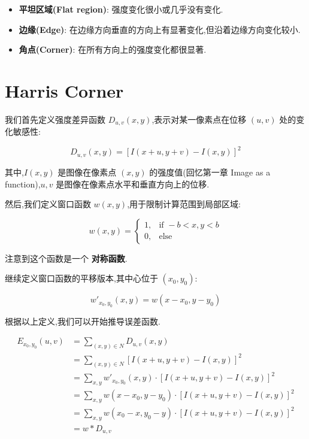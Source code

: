 \begin{itemize}
    \item \textbf{平坦区域(Flat region)}: 强度变化很小或几乎没有变化.
    \item \textbf{边缘(Edge)}: 在边缘方向垂直的方向上有显著变化,但沿着边缘方向变化较小.
    \item \textbf{角点(Corner)}: 在所有方向上的强度变化都很显著.
\end{itemize}

\section{Harris Corner}

我们首先定义强度差异函数 $D_{u,v}(x, y)$,表示对某一像素点在位移 $(u, v)$ 处的变化敏感性:

$$
D_{u,v}(x, y) = \left[I(x + u, y + v) - I(x, y)\right]^2
$$

其中,$I(x, y)$ 是图像在像素点 $(x, y)$ 的强度值(回忆第一章 Image as a function),$u, v$ 是图像在像素点水平和垂直方向上的位移.

然后,我们定义窗口函数 $w(x, y)$,用于限制计算范围到局部区域:

\begin{equation}
    w(x, y) =
    \begin{cases}
        1, & \text{if } -b < x, y < b \\
        0, & \text{else}
    \end{cases}
\end{equation}

注意到这个函数是一个 \textbf{对称函数}.

继续定义窗口函数的平移版本,其中心位于 $(x_0, y_0)$:

\begin{equation}
    w'_{x_0, y_0}(x, y) = w(x - x_0, y - y_0)
\end{equation}

根据以上定义,我们可以开始推导误差函数.

\begin{equation}
\begin{aligned}
E_{x_0, y_0}(u, v) &= \sum_{(x, y) \in N} D_{u,v}(x, y) \\
&= \sum_{(x, y) \in N} \left[I(x + u, y + v) - I(x, y)\right]^2 \\
&= \sum_{x, y} w'_{x_0, y_0}(x, y) \cdot \left[I(x + u, y + v) - I(x, y)\right]^2 \\
&= \sum_{x, y} w(x - x_0, y - y_0) \cdot \left[I(x + u, y + v) - I(x, y)\right]^2 \\
&= \sum_{x, y} w(x_0 - x, y_0 - y) \cdot \left[I(x + u, y + v) - I(x, y)\right]^2 \\
&= w * D_{u,v}
\end{aligned}
\end{equation}

